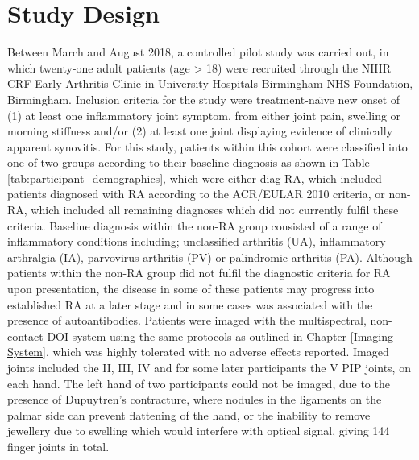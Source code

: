 \documentclass[twoside]{bhamthesis}
\theoremstyle{definition}
\begin{document}
\section{Study Design}
\label{Patient_design}
Between March and August 2018, a controlled pilot study was carried out, in which twenty-one adult patients (age > 18) were recruited through the NIHR CRF Early Arthritis Clinic in University Hospitals Birmingham NHS Foundation, Birmingham. Inclusion criteria for the study were treatment-na\"{\i}ve new onset of (1) at least one inflammatory joint symptom, from either joint pain, swelling or morning stiffness and/or (2) at least one joint displaying evidence of clinically apparent synovitis. For this study, patients within this cohort were classified into one of two groups according to their baseline diagnosis as shown in Table \ref{tab:participant_demographics}, which were either diag-RA, which included patients diagnosed with RA according to the ACR/EULAR 2010 criteria, or non-RA, which included all remaining diagnoses which did not currently fulfil these criteria. Baseline diagnosis within the non-RA group consisted of a range of inflammatory conditions including; unclassified arthritis (UA), inflammatory arthralgia (IA), parvovirus arthritis (PV) or palindromic arthritis (PA). Although patients within the non-RA group did not fulfil the diagnostic criteria for RA upon presentation, the disease in some of these patients may progress into established RA at a later stage and in some cases was associated with the presence of autoantibodies. Patients were imaged with the multispectral, non-contact DOI system using the same protocols as outlined in Chapter \ref{Imaging System}, which was highly tolerated with no adverse effects reported. Imaged joints included the II, III, IV and for some later participants the V PIP joints, on each hand. The left hand of two participants could not be imaged, due to the presence of Dupuytren's contracture, where nodules in the ligaments on the palmar side can prevent flattening of the hand, or the inability to remove jewellery due to swelling which would interfere with optical signal, giving 144 finger joints in total.
\end{document}
